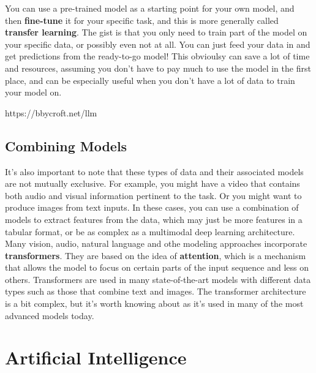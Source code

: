 \documentclass[
  letterpaper,
]{krantz}
\begin{document}
You can use a pre-trained model as a starting point for your own model,
and then \textbf{fine-tune} it for your specific task, and this is more
generally called \textbf{transfer learning}. The gist is that you only
need to train part of the model on your specific data, or possibly even
not at all. You can just feed your data in and get predictions from the
ready-to-go model! This obvioulsy can save a lot of time and resources,
assuming you don't have to pay much to use the model in the first place,
and can be especially useful when you don't have a lot of data to train
your model on.

https://bbycroft.net/llm

\subsection{Combining Models}\label{combining-models}

It's also important to note that these types of data and their
associated models are not mutually exclusive. For example, you might
have a video that contains both audio and visual information pertinent
to the task. Or you might want to produce images from text inputs. In
these cases, you can use a combination of models to extract features
from the data, which may just be more features in a tabular format, or
be as complex as a multimodal deep learning architecture. Many vision,
audio, natural language and othe modeling approaches incorporate
\textbf{transformers}. They are based on the idea of \textbf{attention},
which is a mechanism that allows the model to focus on certain parts of
the input sequence and less on others. Transformers are used in many
state-of-the-art models with different data types such as those that
combine text and images. The transformer architecture is a bit complex,
but it's worth knowing about as it's used in many of the most advanced
models today.

\section{Artificial Intelligence}\label{sec-ml-more-ai}
\end{document}
